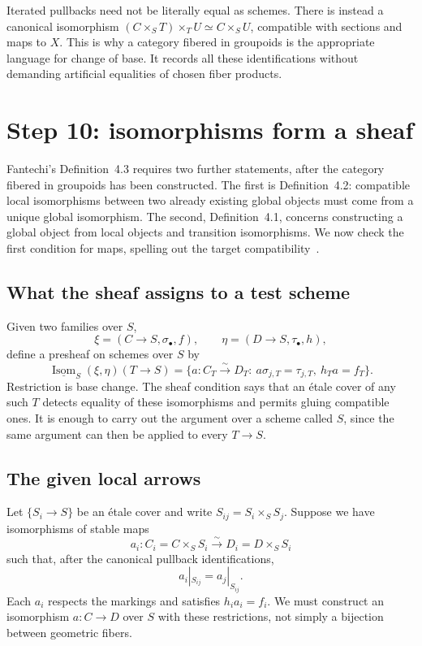 Iterated pullbacks need not be literally equal as schemes. There is instead a canonical isomorphism $(C\times_S T)\times_T U\simeq C\times_S U$, compatible with sections and maps to $X$. This is why a category fibered in groupoids is the appropriate language for change of base. It records all these identifications without demanding artificial equalities of chosen fiber products.

\section{Step 10: isomorphisms form a sheaf}

Fantechi's Definition~4.3 requires two further statements, after the category fibered in groupoids has been constructed. The first is Definition~4.2: compatible local isomorphisms between two already existing global objects must come from a unique global isomorphism. The second, Definition~4.1, concerns constructing a global object from local objects and transition isomorphisms. We now check the first condition for maps, spelling out the target compatibility~\cite[\S4.2--4.3, Definitions~4.1--4.3]{Fantechi}.

\subsection{What the sheaf assigns to a test scheme}

Given two families over $S$,
\[
 \xi=(C\to S,\sigma_\bullet,f),\qquad
 \eta=(D\to S,\tau_\bullet,h),
\]
define a presheaf on schemes over $S$ by
\[
 \underline{\operatorname{Isom}}_S(\xi,\eta)(T\to S)
   =\{a:C_T\xrightarrow{\sim}D_T:\ a\sigma_{j,T}=\tau_{j,T},\ h_Ta=f_T\}.
\]
Restriction is base change. The sheaf condition says that an \'etale cover of any such $T$ detects equality of these isomorphisms and permits gluing compatible ones. It is enough to carry out the argument over a scheme called $S$, since the same argument can then be applied to every $T\to S$.

\subsection{The given local arrows}

Let $\{S_i\to S\}$ be an \'etale cover and write $S_{ij}=S_i\times_S S_j$. Suppose we have isomorphisms of stable maps
\[
 a_i:C_i=C\times_S S_i\xrightarrow{\sim}D_i=D\times_S S_i
\]
such that, after the canonical pullback identifications,
\[
 a_i|_{S_{ij}}=a_j|_{S_{ij}}.
\]
Each $a_i$ respects the markings and satisfies $h_i a_i=f_i$. We must construct an isomorphism $a:C\to D$ over $S$ with these restrictions, not simply a bijection between geometric fibers.

